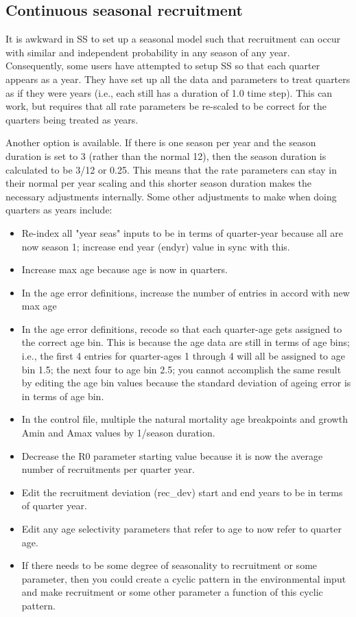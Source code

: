 \subsection{Continuous seasonal recruitment}
It is awkward in SS to set up a seasonal model such that recruitment can occur with similar and independent probability in any season of any year.  Consequently, some users have attempted to setup SS so that each quarter appears as a year.  They have set up all the data and parameters to treat quarters as if they were years (i.e., each still has a duration of 1.0 time step).  This can work, but requires that all rate parameters be re-scaled to be correct for the quarters being treated as years.

Another option is available.  If there is one season per year and the season duration is set to 3 (rather than the normal 12), then the season duration is calculated to be 3/12 or 0.25. This means that the rate parameters can stay in their normal per year scaling and this shorter season duration makes the necessary adjustments internally. Some other adjustments to make when doing quarters as years include:

\begin{itemize}
	\item Re-index all "year seas" inputs to be in terms of quarter-year because all are now season 1; increase end year (endyr) value in sync with this.
	\item Increase max age because age is now in quarters.
	\item In the age error definitions, increase the number of entries in accord with new max age
	\item In the age error definitions, recode so that each quarter-age gets assigned to the correct age bin. This is because the age data are still in terms of age bins; i.e., the first 4 entries for quarter-ages 1 through 4 will all be assigned to age bin 1.5; the next four to age bin 2.5;  you cannot accomplish the same result by editing the age bin values because the standard deviation of ageing error is in terms of age bin.
	\item In the control file, multiple the natural mortality age breakpoints and growth Amin and Amax values by 1/season duration.
	\item Decrease the R0 parameter starting value because it is now the average number of recruitments per quarter year.
	\item Edit the recruitment deviation (rec\_dev) start and end years to be in terms of quarter year.
	\item Edit any age selectivity parameters that refer to age to now refer to quarter age.
	\item If there needs to be some degree of seasonality to recruitment or some parameter, then you could create a cyclic pattern in the environmental input and make recruitment or some other parameter a function of this cyclic pattern.
\end{itemize}

